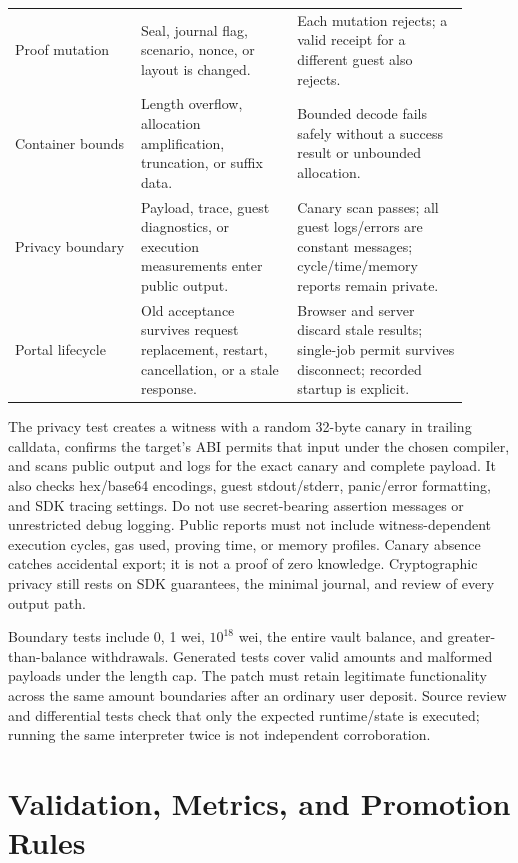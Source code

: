 \documentclass[11pt]{article}
\begin{document}
\begin{longtable}{L{0.25\linewidth}L{0.31\linewidth}L{0.34\linewidth}}
Proof mutation & Seal, journal flag, scenario, nonce, or layout is changed. & Each mutation rejects; a valid receipt for a different guest also rejects. \\
Container bounds & Length overflow, allocation amplification, truncation, or suffix data. & Bounded decode fails safely without a success result or unbounded allocation. \\
Privacy boundary & Payload, trace, guest diagnostics, or execution measurements enter public output. & Canary scan passes; all guest logs/errors are constant messages; cycle/time/memory reports remain private. \\
Portal lifecycle & Old acceptance survives request replacement, restart, cancellation, or a stale response. & Browser and server discard stale results; single-job permit survives disconnect; recorded startup is explicit. \\
\bottomrule
\end{longtable}

The privacy test creates a witness with a random 32-byte canary in trailing calldata, confirms the target's ABI permits that input under the chosen compiler, and scans public output and logs for the exact canary and complete payload. It also checks hex/base64 encodings, guest stdout/stderr, panic/error formatting, and SDK tracing settings. Do not use secret-bearing assertion messages or unrestricted debug logging. Public reports must not include witness-dependent execution cycles, gas used, proving time, or memory profiles. Canary absence catches accidental export; it is not a proof of zero knowledge. Cryptographic privacy still rests on SDK guarantees, the minimal journal, and review of every output path.

Boundary tests include 0, 1 wei, \(10^{18}\) wei, the entire vault balance, and greater-than-balance withdrawals. Generated tests cover valid amounts and malformed payloads under the length cap. The patch must retain legitimate functionality across the same amount boundaries after an ordinary user deposit. Source review and differential tests check that only the expected runtime/state is executed; running the same interpreter twice is not independent corroboration.

\section{Validation, Metrics, and Promotion Rules}
\end{document}
